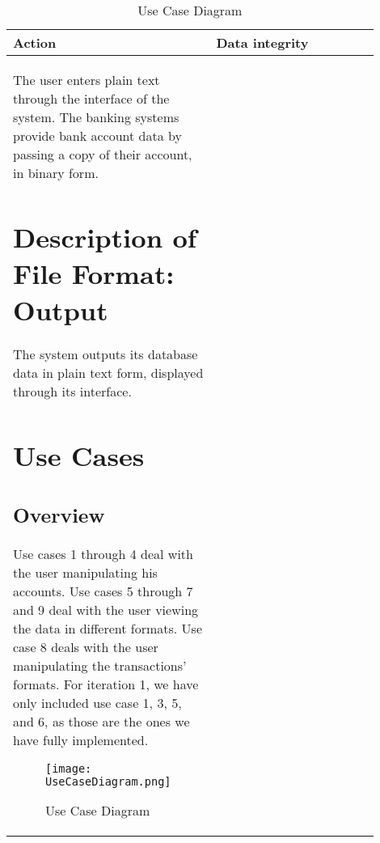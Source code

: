 \documentclass[11pt]{article}
\newcounter{use case ID}
\newcounter{req ID}
\newcommand\tabularheadfsd[1]{
\begin{table}[ht]
    \addtocounter{req ID}{1}
    \caption{Non-Functional Requirement \arabic{req ID} - #1}
    \vspace{0.2cm}
    \begin{tabular}{|p{0.2\linewidth}|p{0.70\linewidth}|}
    \hline
        \textbf{Action} & \textbf{#1} \\
        \hline}
\newenvironment{requirement}{\tabularheadfsd}
{\hline\end{tabular}\end{table}}
\begin{document}
\begin{requirement}{Data integrity}
The user enters plain text through the interface of the system. The banking systems provide bank account data by passing a copy of their account, in binary form.

\section{Description of File Format: Output}

The system outputs its database data in plain text form, displayed through its interface.

\section{Use Cases}
\subsection{Overview}
Use cases 1 through 4 deal with the user manipulating his accounts. Use cases 5 through 7 and 9 deal with the user viewing the data in different formats. Use case 8 deals with the user manipulating the transactions' formats. For iteration 1, we have only included use case 1, 3, 5, and 6, as those are the ones we have fully implemented.

\begin{figure}[htbp]
\texttt{[image: UseCaseDiagram.png]}
\caption{Use Case Diagram}
\label{fig:use-case-diagram}
\end{figure}


\end{requirement}
\end{document}
